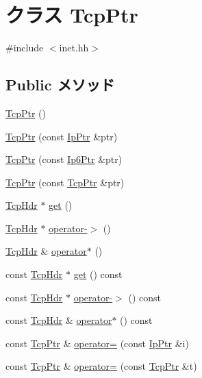 \hypertarget{classNet_1_1TcpPtr}{
\section{クラス TcpPtr}
\label{classNet_1_1TcpPtr}
}


{\ttfamily \#include $<$inet.hh$>$}\subsection*{Public メソッド}
\begin{DoxyCompactItemize}
\item 
\hyperlink{classNet_1_1TcpPtr_ac6e8d0bb54cb7e4603a42ea0db870e32}{TcpPtr} ()
\item 
\hyperlink{classNet_1_1TcpPtr_ae6fa0d839da0d9cae52d8f1fed13b9df}{TcpPtr} (const \hyperlink{classNet_1_1IpPtr}{IpPtr} \&ptr)
\item 
\hyperlink{classNet_1_1TcpPtr_a13ffa86151b1bfcf1f980300581ed5d8}{TcpPtr} (const \hyperlink{classNet_1_1Ip6Ptr}{Ip6Ptr} \&ptr)
\item 
\hyperlink{classNet_1_1TcpPtr_a352cc3516ed67de8487c9205b9376ea0}{TcpPtr} (const \hyperlink{classNet_1_1TcpPtr}{TcpPtr} \&ptr)
\item 
\hyperlink{structNet_1_1TcpHdr}{TcpHdr} $\ast$ \hyperlink{classNet_1_1TcpPtr_ad425903dd5be36812b8cb0f3fc9c3b49}{get} ()
\item 
\hyperlink{structNet_1_1TcpHdr}{TcpHdr} $\ast$ \hyperlink{classNet_1_1TcpPtr_a77ed9d83e032caec54b831aabea50dac}{operator-\/$>$} ()
\item 
\hyperlink{structNet_1_1TcpHdr}{TcpHdr} \& \hyperlink{classNet_1_1TcpPtr_a8a7f53969ce71388158c3e38493ba9f3}{operator$\ast$} ()
\item 
const \hyperlink{structNet_1_1TcpHdr}{TcpHdr} $\ast$ \hyperlink{classNet_1_1TcpPtr_a6d31bdfc8c5f84b6a4a791db973df4c2}{get} () const 
\item 
const \hyperlink{structNet_1_1TcpHdr}{TcpHdr} $\ast$ \hyperlink{classNet_1_1TcpPtr_a5a8969d9dfbdfb9e8c0566fb2300e05d}{operator-\/$>$} () const 
\item 
const \hyperlink{structNet_1_1TcpHdr}{TcpHdr} \& \hyperlink{classNet_1_1TcpPtr_a2ca7a4d104b858c85e87c0ae34a2c1a4}{operator$\ast$} () const 
\item 
const \hyperlink{classNet_1_1TcpPtr}{TcpPtr} \& \hyperlink{classNet_1_1TcpPtr_a75eaf964740c52e5f7c2274f530dacb3}{operator=} (const \hyperlink{classNet_1_1IpPtr}{IpPtr} \&i)
\item 
const \hyperlink{classNet_1_1TcpPtr}{TcpPtr} \& \hyperlink{classNet_1_1TcpPtr_a886897a4af35dd25e1d94e9758f2a635}{operator=} (const \hyperlink{classNet_1_1TcpPtr}{TcpPtr} \&t)

\end{DoxyCompactItemize}
